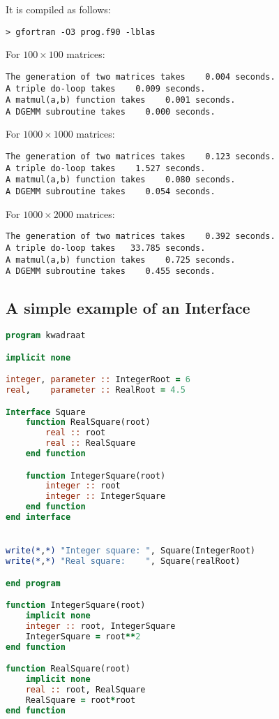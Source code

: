 It is compiled as follows:
\begin{verbatim}
> gfortran -O3 prog.f90 -lblas
\end{verbatim}

For $100\times100$ matrices:
\begin{verbatim}
The generation of two matrices takes    0.004 seconds.
A triple do-loop takes    0.009 seconds.
A matmul(a,b) function takes    0.001 seconds.
A DGEMM subroutine takes    0.000 seconds.
\end{verbatim}

For $1000\times1000$ matrices:
\begin{verbatim}
The generation of two matrices takes    0.123 seconds.
A triple do-loop takes    1.527 seconds.
A matmul(a,b) function takes    0.080 seconds.
A DGEMM subroutine takes    0.054 seconds.
\end{verbatim}

For $1000\times2000$ matrices:
\begin{verbatim}
The generation of two matrices takes    0.392 seconds.
A triple do-loop takes   33.785 seconds.
A matmul(a,b) function takes    0.725 seconds.
A DGEMM subroutine takes    0.455 seconds.
\end{verbatim}


\subsection{A simple example of an Interface}

\begin{lstlisting}[language=Fortran]
program kwadraat

implicit none

integer, parameter :: IntegerRoot = 6
real,    parameter :: RealRoot = 4.5

Interface Square  
    function RealSquare(root)
        real :: root
        real :: RealSquare
    end function

    function IntegerSquare(root)
        integer :: root
        integer :: IntegerSquare
    end function
end interface


write(*,*) "Integer square: ", Square(IntegerRoot)
write(*,*) "Real square:    ", Square(realRoot)

end program

function IntegerSquare(root)
    implicit none
    integer :: root, IntegerSquare
    IntegerSquare = root**2
end function

function RealSquare(root)
    implicit none
    real :: root, RealSquare
    RealSquare = root*root
end function
\end{lstlisting}
